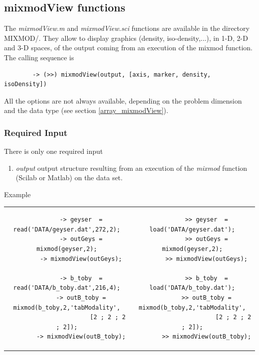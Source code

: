 
\subsection{{\sc mixmodView} functions}
The  {\em mixmodView.m} and {\em mixmodView.sci} functions are available in the directory MIXMOD/. They allow to
display graphics (density, iso-density,...), in 1-D, 2-D and 3-D spaces, of the output coming from an execution of
the {\sc mixmod} function.\\

The calling sequence is
{\scriptsize
\begin{verbatim}
        -> (>>) mixmodView(output, [axis, marker, density, isoDensity])
\end{verbatim}}

All the options are not always available, depending on the problem dimension and the data type
(see section \ref{array_mixmodView}).
\subsubsection{Required Input}
There is only one required input
\begin{enumerate}
  \item {\em output} output structure resulting from an execution of the {\em mixmod} function (Scilab or Matlab)
on the data set.
\end{enumerate}
{\noindent Example\\}

\begin{tabular}{c|c}
\begin{minipage}[c]{0.50\columnwidth}%
{\scriptsize
\begin{verbatim}
        -> geyser  = read('DATA/geyser.dat',272,2);
        -> outGeys = mixmod(geyser,2);
        -> mixmodView(outGeys);

        -> b_toby  = read('DATA/b_toby.dat',216,4);
        -> outB_toby = mixmod(b_toby,2,'tabModality',
                       [2 ; 2 ; 2 ; 2]);
        -> mixmodView(outB_toby);
\end{verbatim}}
\end{minipage}%
&
\begin{minipage}[c]{0.50\columnwidth}%
{\scriptsize
\begin{verbatim}
        >> geyser  = load('DATA/geyser.dat');
        >> outGeys = mixmod(geyser,2);
        >> mixmodView(outGeys);

        >> b_toby  = load('DATA/b_toby.dat');
        >> outB_toby = mixmod(b_toby,2,'tabModality',
                       [2 ; 2 ; 2 ; 2]);
        >> mixmodView(outB_toby);
\end{verbatim}}
\end{minipage}%
\end{tabular}

